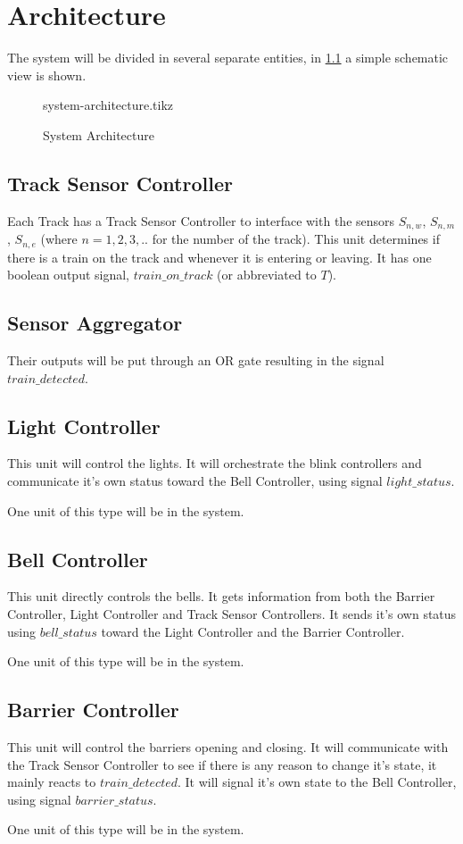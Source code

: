 \documentclass[final]{report}
\begin{document}
\chapter{Architecture}
The system will be divided in several separate entities, in \cref{fig:system-architecture} a simple schematic view is shown.

\begin{figure}[H]
	\centering
	{system-architecture.tikz}
	\caption{System Architecture}
	\label{fig:system-architecture}
\end{figure}

\section{Track Sensor Controller}\label{sec:architecture-track-sensor-controller}
Each Track has a Track Sensor Controller to interface with the sensors $S_{n,w}$, $S_{n,m}$, $S_{n,e}$ (where $n = 1,2,3,..$ for the number of the track).
This unit determines if there is a train on the track and whenever it is entering or leaving.
It has one boolean output signal, $train\_on\_track$ (or abbreviated to $T$).


\section{Sensor Aggregator}\label{sec:architecture-sensor-aggregator}
Their outputs will be put through an OR gate resulting in the signal $train\_detected$.

\section{Light Controller}\label{sec:architecture-light-controller}
This unit will control the lights.
It will orchestrate the blink controllers and communicate it's own status toward the Bell Controller, using signal $light\_status$.

One unit of this type will be in the system.

\section{Bell Controller}\label{sec:architecture-bell-controller}
This unit directly controls the bells.
It gets information from both the Barrier Controller, Light Controller and Track Sensor Controllers.
It sends it's own status using $bell\_status$ toward the Light Controller and the Barrier Controller.

One unit of this type will be in the system.

\section{Barrier Controller}\label{sec:architecture-barrier-controller}
This unit will control the barriers opening and closing.
It will communicate with the Track Sensor Controller to see if there is any reason to change it's state, it mainly reacts to $train\_detected$.
It will signal it's own state to the Bell Controller, using signal $barrier\_status$.

One unit of this type will be in the system.
\end{document}
